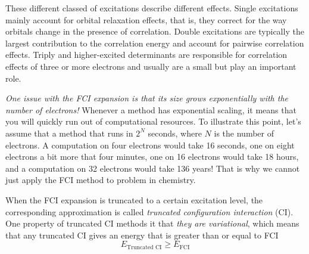 \documentclass[../Main/notes.tex]{subfiles}
\begin{document}

These different classed of excitations describe different effects.
Single excitations mainly account for orbital relaxation effects, that is, they correct for the way orbitals change in the presence of correlation.
Double excitations are typically the largest contribution to the correlation energy and account for pairwise correlation effects.
Triply and higher-excited determinants are responsible for correlation effects of three or more electrons and usually are a small but play an important role.


\emph{One issue with the FCI expansion is that its size grows exponentially with the number of electrons!}
Whenever a method has exponential scaling, it means that you will quickly run out of computational resources.
To illustrate this point, let's assume that a method that runs in $2^N$ seconds, where $N$ is the number of electrons.
A computation on four electrons would take 16 seconds, one on eight electrons a bit more that four minutes, one on 16 electrons would take 18 hours, and a computation on 32 electrons would take 136 years!
That is why we cannot just apply the FCI method to problem in chemistry.


When the FCI expansion is truncated to a certain excitation level, the corresponding approximation is called \emph{truncated configuration interaction} (CI).
One property of truncated CI methods it that \emph{they are variational}, which means that any truncated CI gives an energy that is greater than or equal to FCI
\begin{equation}
E_\text{Truncated CI} \geq E_\text{FCI}
\end{equation}
\end{document}
